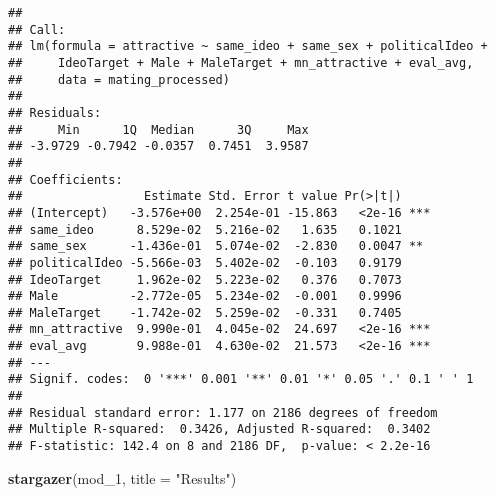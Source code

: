 \documentclass[]{article}
\newenvironment{Shaded}{\begin{snugshade}}{\end{snugshade}}
\newcommand{\KeywordTok}[1]{\textcolor[rgb]{0.13,0.29,0.53}{\textbf{#1}}}
\newcommand{\DataTypeTok}[1]{\textcolor[rgb]{0.13,0.29,0.53}{#1}}
\newcommand{\DecValTok}[1]{\textcolor[rgb]{0.00,0.00,0.81}{#1}}
\newcommand{\StringTok}[1]{\textcolor[rgb]{0.31,0.60,0.02}{#1}}
\newcommand{\NormalTok}[1]{#1}
\begin{document}
\begin{verbatim}
## 
## Call:
## lm(formula = attractive ~ same_ideo + same_sex + politicalIdeo + 
##     IdeoTarget + Male + MaleTarget + mn_attractive + eval_avg, 
##     data = mating_processed)
## 
## Residuals:
##     Min      1Q  Median      3Q     Max 
## -3.9729 -0.7942 -0.0357  0.7451  3.9587 
## 
## Coefficients:
##                 Estimate Std. Error t value Pr(>|t|)    
## (Intercept)   -3.576e+00  2.254e-01 -15.863   <2e-16 ***
## same_ideo      8.529e-02  5.216e-02   1.635   0.1021    
## same_sex      -1.436e-01  5.074e-02  -2.830   0.0047 ** 
## politicalIdeo -5.566e-03  5.402e-02  -0.103   0.9179    
## IdeoTarget     1.962e-02  5.223e-02   0.376   0.7073    
## Male          -2.772e-05  5.234e-02  -0.001   0.9996    
## MaleTarget    -1.742e-02  5.259e-02  -0.331   0.7405    
## mn_attractive  9.990e-01  4.045e-02  24.697   <2e-16 ***
## eval_avg       9.988e-01  4.630e-02  21.573   <2e-16 ***
## ---
## Signif. codes:  0 '***' 0.001 '**' 0.01 '*' 0.05 '.' 0.1 ' ' 1
## 
## Residual standard error: 1.177 on 2186 degrees of freedom
## Multiple R-squared:  0.3426, Adjusted R-squared:  0.3402 
## F-statistic: 142.4 on 8 and 2186 DF,  p-value: < 2.2e-16
\end{verbatim}

\begin{Shaded}
\begin{Highlighting}[]
\KeywordTok{stargazer}\NormalTok{(mod_}\DecValTok{1}\NormalTok{, }\DataTypeTok{title =} \StringTok{"Results"}\NormalTok{)}
\end{Highlighting}
\end{Shaded}
\end{document}
